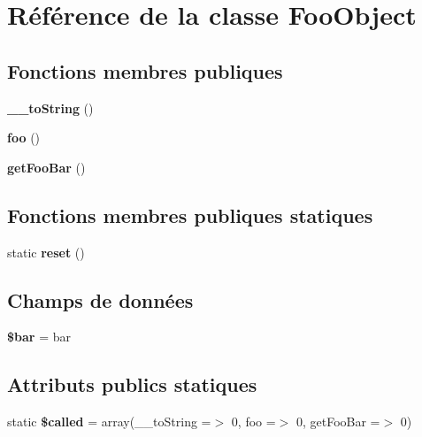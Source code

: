 \hypertarget{class_foo_object}{}\section{Référence de la classe Foo\+Object}
\label{class_foo_object}
\subsection*{Fonctions membres publiques}
\begin{DoxyCompactItemize}
\item 
{\bfseries \+\_\+\+\_\+to\+String} ()\hypertarget{class_foo_object_a7516ca30af0db3cdbf9a7739b48ce91d}{}\label{class_foo_object_a7516ca30af0db3cdbf9a7739b48ce91d}

\item 
{\bfseries foo} ()\hypertarget{class_foo_object_a79418a120498dd9cf915655654607747}{}\label{class_foo_object_a79418a120498dd9cf915655654607747}

\item 
{\bfseries get\+Foo\+Bar} ()\hypertarget{class_foo_object_a986c9aa28cbf2b1878d88ef04b023954}{}\label{class_foo_object_a986c9aa28cbf2b1878d88ef04b023954}

\end{DoxyCompactItemize}
\subsection*{Fonctions membres publiques statiques}
\begin{DoxyCompactItemize}
\item 
static {\bfseries reset} ()\hypertarget{class_foo_object_a2325df26721fdbe820d577d2482725f8}{}\label{class_foo_object_a2325df26721fdbe820d577d2482725f8}

\end{DoxyCompactItemize}
\subsection*{Champs de données}
\begin{DoxyCompactItemize}
\item 
{\bfseries \$bar} = \textquotesingle{}bar\textquotesingle{}\hypertarget{class_foo_object_ab669d165b99e23bf90d68a0a057f69ac}{}\label{class_foo_object_ab669d165b99e23bf90d68a0a057f69ac}

\end{DoxyCompactItemize}
\subsection*{Attributs publics statiques}
\begin{DoxyCompactItemize}
\item 
static {\bfseries \$called} = array(\textquotesingle{}\+\_\+\+\_\+to\+String\textquotesingle{} =$>$ 0, \textquotesingle{}foo\textquotesingle{} =$>$ 0, \textquotesingle{}get\+Foo\+Bar\textquotesingle{} =$>$ 0)\hypertarget{class_foo_object_af5430c68ad78315a9888e8d1650adfaf}{}\label{class_foo_object_af5430c68ad78315a9888e8d1650adfaf}

\end{DoxyCompactItemize}


